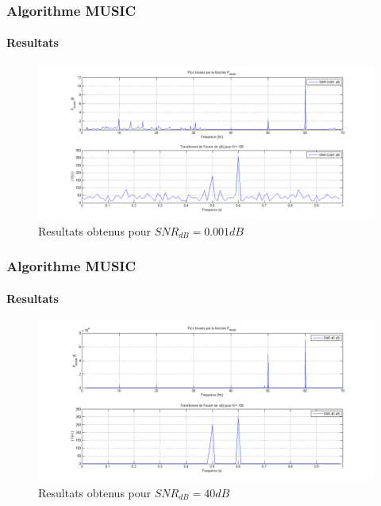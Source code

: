 \documentclass[10pt]{beamer}
\begin{document}

\begin{frame}
%
\frametitle{Algorithme MUSIC}
\framesubtitle{Resultats}

\begin{figure}[h]
\centering
\includegraphics[scale= 0.28]{images/snr0001}
\caption{Resultats obtenus pour \(SNR_{dB} = 0.001 dB\)}
\label{fig:wave0001}
\end{figure}

\end{frame}


\begin{frame}
%
\frametitle{Algorithme MUSIC}
\framesubtitle{Resultats}

\begin{figure}[h]
%
\centering
\includegraphics[scale=0.28 ]{images/snr40}
\caption{Resultats obtenus pour \(SNR_{dB} = 40 dB\)}
\label{fig:snr40}
\end{figure}
\end{frame}

\end{document}
